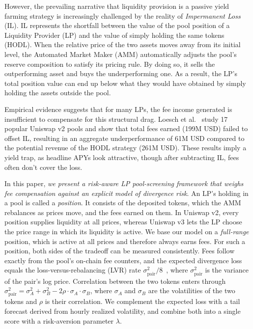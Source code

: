 \documentclass[10pt,conference,compsocconf]{IEEEtran}
\begin{document}
However, the prevailing narrative that liquidity provision is a passive yield farming strategy is increasingly challenged by the reality of \textit{Impermanent Loss} (IL). IL represents the shortfall between the value of the pool position of a Liquidity Provider (LP) and the value of simply holding the same tokens (HODL). When the relative price of the two assets moves away from its initial level, the Automated Market Maker (AMM) automatically adjusts the pool’s reserve composition to satisfy its pricing rule.
By doing so, it sells the outperforming asset and buys the underperforming one.
As a result, the LP's total position value can end up below what they would have obtained by simply holding the assets outside the pool.

Empirical evidence suggests that for many LPs, the fee income generated is insufficient to compensate for this structural drag.
Loesch et al.~\cite{loesch2021impermanent} study 17 popular Uniswap v2 pools and show that total fees earned (199M USD) failed to offset IL, resulting in an aggregate underperformance of 61M USD compared to the potential revenue of the HODL strategy (261M USD).
These results imply a yield trap, as headline APYs look attractive, though after subtracting IL, fees often don’t cover the loss.

In this paper, \textit{we present a risk-aware LP pool-screening framework that weighs fee compensation against an explicit model of divergence risk}.
An LP's holding in a pool is called a \emph{position}. It consists of the deposited tokens, which the AMM rebalances as prices move, and the fees earned on them. In Uniswap v2, every position supplies liquidity at all prices, whereas Uniswap v3 lets the LP choose the price range in which its liquidity is active. We base our model on a \emph{full-range} position, which is active at all prices and therefore always earns fees. For such a position, both sides of the tradeoff can be measured consistently. Fees follow exactly from the pool's on-chain fee counters, and the expected divergence loss equals the loss-versus-rebalancing (LVR) rate $\sigma^2_{\text{pair}}/8$~\cite{milionis2022automated}, where $\sigma^2_{\text{pair}}$ is the variance of the pair's log price. Correlation between the two tokens enters through $\sigma^2_{\text{pair}}=\sigma_A^2+\sigma_B^2-2\rho\cdot\sigma_A\cdot\sigma_B$, where $\sigma_A$ and $\sigma_B$ are the volatilities of the two tokens and $\rho$ is their correlation. We complement the expected loss with a tail forecast derived from hourly realized volatility, and combine both into a single score with a risk-aversion parameter $\lambda$.
\end{document}
